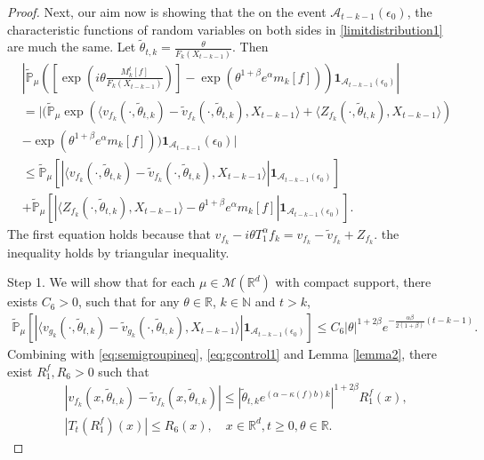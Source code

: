 \documentclass[12pt, a4paper]{amsart}
\theoremstyle{definition}
\numberwithin{equation}{section}
\begin{document}
\begin{proof}
    Next, our aim now is showing that the on the event $\mathcal{A}_{t-k-1}(\epsilon_0)$, the characteristic functions of random variables on both sides in \eqref{limitdistribution1} are much the same. Let $\tilde{\theta}_{t,k}=\frac{\theta}{F_k(X_{t-k-1})}$. Then
    \begin{align*}
        &\left|\mathbb{\tilde{P}}_{\mu}\left([\exp(i\theta \frac {M_k^t[f]}{F_k(X_{t-k-1})})]-\exp(\theta^{1+\beta}e^{\alpha}m_k[f])\right)\mathbf{1}_{\mathcal{A}_{t-k-1}(\epsilon_0)}\right|\\
        &=\bigg|\big(\mathbb{\tilde{P}}_{\mu}\exp(\langle v_{f_k}(\cdot,\tilde{\theta}_{t,k})-\tilde{v}_{f_k}(\cdot, \tilde{\theta}_{t,k}),X_{t-k-1}\rangle+\langle Z_{f_k}(\cdot,\tilde{\theta}_{t,k}),X_{t-k-1}\rangle)\\
        &-\exp(\theta^{1+\beta}e^{\alpha}m_k[f])\big)\mathbf{1}_{\mathcal{A}_{t-k-1}}(\epsilon_0)\bigg|\\
        &\leq \mathbb{\tilde{P}}_{\mu}\left[\left|\langle v_{f_k}(\cdot,\tilde{\theta}_{t,k})-\tilde{v}_{f_k}(\cdot,\tilde{\theta}_{t,k}), X_{t-k-1}\rangle\right|\mathbf{1}_{\mathcal{A}_{t-k-1}(\epsilon_0)}\right]\\
        &+\mathbb{\tilde{P}}_{\mu}\left[\left|\langle Z_{f_k}(\cdot,\tilde{\theta}_{t,k}),X_{t-k-1}\rangle-\theta^{1+\beta}e^{\alpha}m_k[f]\right|\mathbf{1}_{\mathcal{A}_{t-k-1}(\epsilon_0)}\right].
    \end{align*}
    The first equation holds because that $v_{f_k}-i\theta T_1^{\alpha}f_k=v_{f_k}-\tilde{v}_{f_k}+Z_{f_k}$. the inequality holds by triangular inequality.

Step 1.  We will show that for each $\mu \in\mathcal{M}(\mathbb{R}^d)$ with compact support, there exists $C_6>0$, such that for any $\theta\in \mathbb{R}$, $k\in\mathbb{N}$ and $t>k$,
    \begin{align}
    \label{lemma31q}  
        \mathbb{\tilde{P}}_{\mu}\left[\left|\langle v_{g_k}(\cdot,\tilde{\theta}_{t,k})-\tilde{v}_{g_k}(\cdot,\tilde{\theta}_{t,k}), X_{t-k-1}\rangle\right|\mathbf{1}_{\mathcal{A}_{t-k-1}(\epsilon_0)}\right]\leq C_6|\theta|^{1+2\beta}e^{-\frac{\alpha\beta}{2(1+\beta)}(t-k-1)}.
    \end{align}
Combining with \eqref{eq:semigroupineq}, \eqref{eq:gcontrol1} and Lemma \ref{lemma2}, there exist $R_1^f,R_6>0$ such that
\begin{align}
    & |v_{f_k}(x,\tilde{\theta}_{t,k})-\tilde{v}_{f_k}(x,\tilde{\theta}_{t,k})|\leq |\tilde{\theta}_{t,k} e^{(\alpha-\kappa(f) b)k}|^{1+2\beta}R^f_1(x),\\
    & |T_t (R^f_1)(x)|\leq R_6(x), \quad x\in \mathbb{R}^d,t\geq 0, \theta \in \mathbb{R}.
\end{align}


\end{proof}
\end{document}

